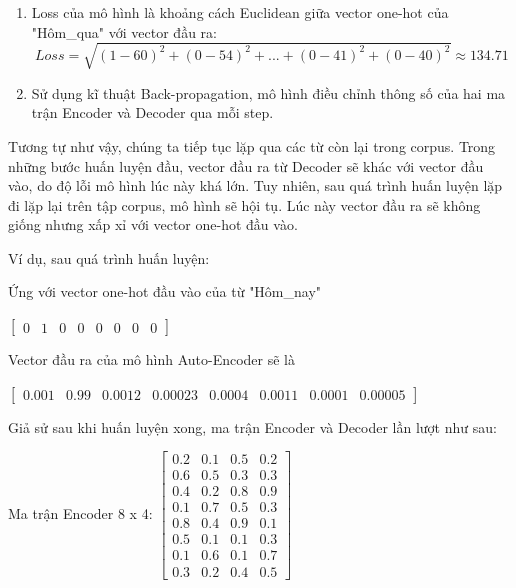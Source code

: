 \begin{enumerate}
    \item Loss của mô hình là khoảng cách Euclidean giữa vector one-hot của "Hôm\_qua" với vector đầu ra:
    \begin{displaymath}
        Loss = \sqrt{(1-60)^2 + (0-54)^2 + ... + (0-41)^2 + (0-40)^2} \approx 134.71
    \end{displaymath}
    
    \item Sử dụng kĩ thuật Back-propagation, mô hình điều chỉnh thông số của hai ma trận Encoder và Decoder qua mỗi step.
\end{enumerate}

Tương tự như vậy, chúng ta tiếp tục lặp qua các từ còn lại trong corpus. Trong những bước huấn luyện đầu, vector đầu ra từ Decoder sẽ khác với vector đầu vào, do độ lỗi mô hình lúc này khá lớn. Tuy nhiên, sau quá trình huấn luyện lặp đi lặp lại trên tập corpus, mô hình sẽ hội tụ. Lúc này vector đầu ra sẽ không giống nhưng xấp xỉ với vector one-hot đầu vào.

Ví dụ, sau quá trình huấn luyện:

Ứng với vector one-hot đầu vào của từ "Hôm\_nay"
\begin{center}
$\begin{bmatrix}
0 & 1 & 0 & 0 & 0 & 0 & 0 & 0
\end{bmatrix}$
\end{center}

Vector đầu ra của mô hình Auto-Encoder sẽ là
\begin{center}
$\begin{bmatrix}
0.001 & 0.99 & 0.0012 & 0.00023 & 0.0004 & 0.0011 & 0.0001 & 0.00005
\end{bmatrix}$
\end{center}

Giả sử sau khi huấn luyện xong, ma trận Encoder và Decoder lần lượt như sau:

Ma trận Encoder 8 x 4:
$\begin{bmatrix}
 0.2 & 0.1 & 0.5 & 0.2 \\
 0.6 & 0.5 & 0.3 & 0.3 \\
 0.4 & 0.2 & 0.8 & 0.9 \\
 0.1 & 0.7 & 0.5 & 0.3 \\
 0.8 & 0.4 & 0.9 & 0.1 \\
 0.5 & 0.1 & 0.1 & 0.3 \\
 0.1 & 0.6 & 0.1 & 0.7 \\
 0.3 & 0.2 & 0.4 & 0.5
\end{bmatrix}$


